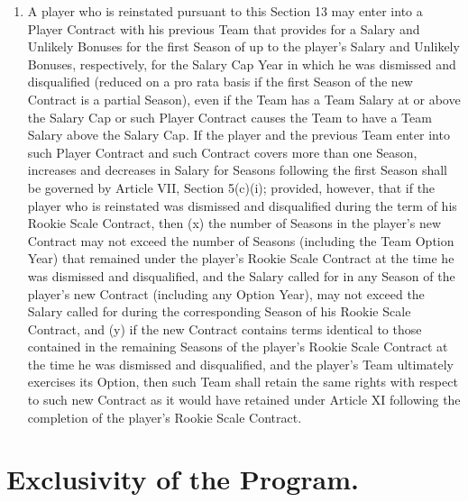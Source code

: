 \documentclass[
]{book}
\begin{document}
\begin{enumerate}
\begin{enumerate}
  \item
    A player who is reinstated pursuant to this Section 13 may enter into a Player Contract with his previous Team that provides for a Salary and Unlikely Bonuses for the first Season of up to the player's Salary and Unlikely Bonuses, respectively, for the Salary Cap Year in which he was dismissed and disqualified (reduced on a pro rata basis if the first Season of the new Contract is a partial Season), even if the Team has a Team Salary at or above the Salary Cap or such Player Contract causes the Team to have a Team Salary above the Salary Cap. If the player and the previous Team enter into such Player Contract and such Contract covers more than one Season, increases and decreases in Salary for Seasons following the first Season shall be governed by Article VII, Section 5(c)(i); provided, however, that if the player who is reinstated was dismissed and disqualified during the term of his Rookie Scale Contract, then (x) the number of Seasons in the player's new Contract may not exceed the number of Seasons (including the Team Option Year) that remained under the player's Rookie Scale Contract at the time he was dismissed and disqualified, and the Salary called for in any Season of the player's new Contract (including any Option Year), may not exceed the Salary called for during the corresponding Season of his Rookie Scale Contract, and (y) if the new Contract contains terms identical to those contained in the remaining Seasons of the player's Rookie Scale Contract at the time he was dismissed and disqualified, and the player's Team ultimately exercises its Option, then such Team shall retain the same rights with respect to such new Contract as it would have retained under Article XI following the completion of the player's Rookie Scale Contract.
  \end{enumerate}
\end{enumerate}

\hypertarget{exclusivity-of-the-program.}{%
\section{Exclusivity of the Program.}\label{exclusivity-of-the-program.}}
\end{document}
